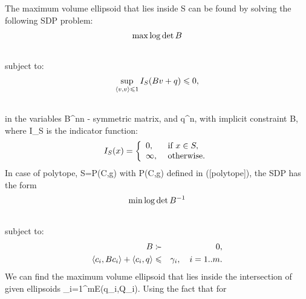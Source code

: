\documentclass[letterpaper,10pt,english]{sphinxmanual}
\begin{document}
The maximum volume ellipsoid that lies inside S can be found by
solving the following SDP problem:
\begin{gather}
\begin{split}\max \log \det B\end{split}\notag\\\begin{split}\end{split}\notag
\end{gather}
subject to:
\begin{gather}
\begin{split}\sup_{\langle v,v\rangle\leqslant1} I_S(Bv+q)\leqslant0 ,\end{split}\notag\\\begin{split}\end{split}\notag
\end{gather}
in the variables B^{n\times n} - symmetric matrix,
and q^n, with implicit constraint B,
where I_S is the indicator function:
\begin{gather}
\begin{split}I_S(x) = \left\{\begin{array}{ll}
0, & \mbox{ if } x\in S,\\
\infty, & \mbox{ otherwise.}\end{array}\right.\end{split}\notag
\end{gather}
In case of polytope, S=P(C,g) with P(C,g) defined in
({[}polytope{]}), the SDP has the form
\begin{gather}
\begin{split}\min \log \det B^{-1}\end{split}\notag\\\begin{split}\end{split}\notag
\end{gather}
subject to:
\begin{gather}
\begin{split}\begin{aligned}
B & \succ & 0,\\
\langle c_i, Bc_i\rangle + \langle c_i, q\rangle & \leqslant& \gamma_i,
~~~ i=1..m.\end{aligned}\end{split}\notag
\end{gather}
We can find the maximum volume ellipsoid that lies inside the
intersection of given ellipsoids
\bigcap_{i=1}^m{\mathcal E}(q_i,Q_i). Using the fact that for
\end{document}
